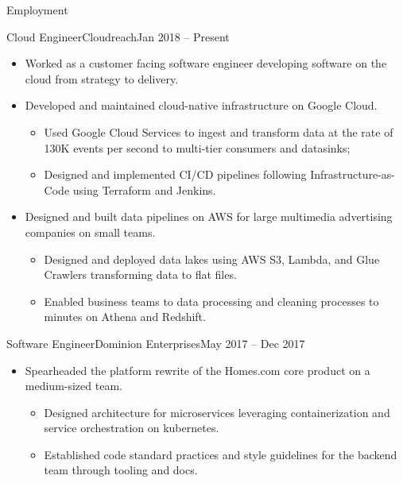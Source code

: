 \documentclass[]{mcdowellcv}
\begin{document}
    \makeheader

    \begin{cvsection}{Employment}


        \begin{cvsubsection}{Cloud Engineer}{Cloudreach}{Jan 2018 – Present}
            \begin{itemize}
                \item Worked as a customer facing software engineer developing software on the cloud from strategy to delivery. 
                \item Developed and maintained cloud-native infrastructure on Google Cloud.
                    \begin{itemize}
                            \item Used Google Cloud Services to ingest and transform data at the rate of 130K events per second to multi-tier consumers and datasinks;
                            \item Designed and implemented CI/CD pipelines following Infrastructure-as-Code using Terraform and Jenkins.
                    \end{itemize}
                \end{itemize}
                \begin{itemize}
                    \item Designed and built data pipelines on AWS for large multimedia advertising companies on small teams.
                    \begin{itemize}
                        \item Designed and deployed data lakes using AWS S3, Lambda, and Glue Crawlers transforming data to flat files. 
                        \item Enabled business teams to data processing and cleaning processes to minutes on Athena and Redshift.
                    \end{itemize}
                \end{itemize}
        \end{cvsubsection}

        \begin{cvsubsection}{Software Engineer}{Dominion Enterprises}{May 2017 – Dec 2017}
            \begin{itemize}
                \item Spearheaded the platform rewrite of the Homes.com core product on a medium-sized team.
                \begin{itemize}
                    \item Designed architecture for microservices leveraging containerization and service orchestration on kubernetes. 
                    \item Established code standard practices and style guidelines for the backend team through tooling and docs.
                \end{itemize}
            \end{itemize}
        \end{cvsubsection}


\end{cvsection}
\end{document}
